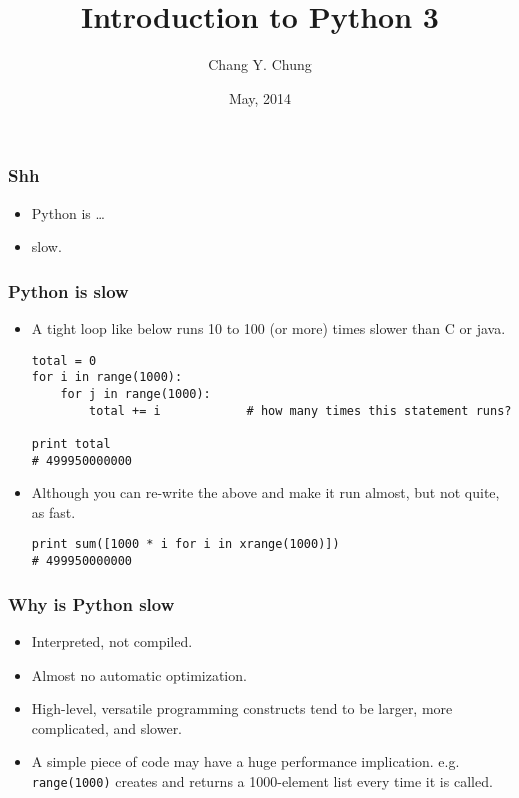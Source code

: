 \documentclass{beamer}
\begin{document}
\title{Introduction to Python 3}
\date{May, 2014}
\author{Chang Y. Chung}
\institute{}

{
\begin{frame}[noframenumbering]
\titlepage
\end{frame}}

\begin{frame}[fragile]
\frametitle{Shh}
\begin{itemize}
\item<1-> Python is \ldots
\item<2-> slow.
\end{itemize}
\end{frame}

\begin{frame}[fragile]
\frametitle{Python is slow}
\begin{itemize}
\item<1-> A tight loop like below runs 10 to 100 (or more)
          times slower than C or java.
\begin{lstlisting}
total = 0
for i in range(1000):
    for j in range(1000):
        total += i            # how many times this statement runs?

print total
# 499950000000
\end{lstlisting}
\item<2-> Although you can re-write the above and make
          it run almost, but not quite, as fast.
\begin{lstlisting}
print sum([1000 * i for i in xrange(1000)])
# 499950000000
\end{lstlisting}
\end{itemize}
\end{frame}

\begin{frame}[fragile]
\frametitle{Why is Python slow}
\begin{itemize}
\item Interpreted, not compiled.
\item Almost no automatic optimization.
\item High-level, versatile programming constructs tend 
      to be larger, more complicated, and slower.
\item A simple piece of code may have a huge performance
      implication. e.g. \lstinline{range(1000)}
      creates and returns
      a 1000-element list every time it is called.
\end{itemize}
\end{frame}
\end{document}
